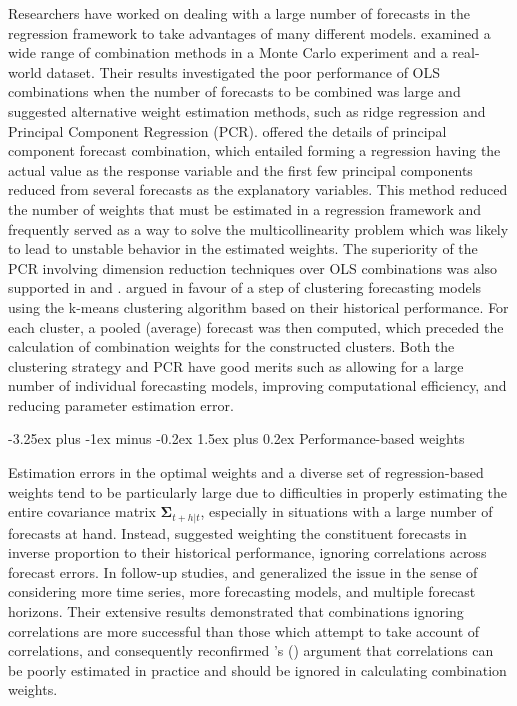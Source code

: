 \documentclass[11pt]{article}
\makeatletter
\def\citeapos#1{\citeauthor{#1}'s (\citeyear{#1})}
\renewcommand{\paragraph}{\@startsection{paragraph}{4}{0ex}%
   {-3.25ex plus -1ex minus -0.2ex}%
   {1.5ex plus 0.2ex}%
   {\normalfont\normalsize\bfseries}}
\makeatother
\begin{document}
Researchers have worked on dealing with a large number of forecasts in the regression framework to take advantages of many different models. \cite{Chan1999-io} examined a wide range of combination methods in a Monte Carlo experiment and a real-world dataset. Their results investigated the poor performance of OLS combinations when the number of forecasts to be combined was large and suggested alternative weight estimation methods, such as ridge regression and Principal Component Regression (PCR). \cite{Stock2004-rq} offered the details of principal component forecast combination, which entailed forming a regression having the actual value as the response variable and the first few principal components reduced from several forecasts as the explanatory variables. This method reduced the number of weights that must be estimated in a regression framework and frequently served as a way to solve the multicollinearity problem which was likely to lead to unstable behavior in the estimated weights. The superiority of the PCR involving dimension reduction techniques over OLS combinations was also supported in \cite{Rapach2008-jh} and \cite{Poncela2011-vz}. \cite{Aiolfi2006-rh} argued in favour of a step of clustering forecasting models using the k-means clustering algorithm based on their historical performance. For each cluster, a pooled (average) forecast was then computed, which preceded the calculation of combination weights for the constructed clusters. Both the clustering strategy and PCR have good merits such as allowing for a large number of individual forecasting models, improving computational efficiency, and reducing parameter estimation error.

\paragraph{Performance-based weights}

Estimation errors in the optimal weights and a diverse set of regression-based weights tend to be particularly large due to difficulties in properly estimating the entire covariance matrix $\boldsymbol{\Sigma}_{t+h|t}$, especially in situations with a large number of forecasts at hand. Instead, \cite{Bates1969-yj} suggested weighting the constituent forecasts in inverse proportion to their historical performance, ignoring correlations across forecast errors. In follow-up studies, \cite{Newbold1974-lp} and \cite{Winkler1983-ra} generalized the issue in the sense of considering more time series, more forecasting models, and multiple forecast horizons. Their extensive results demonstrated that combinations ignoring correlations are more successful than those which attempt to take account of correlations, and consequently reconfirmed \citeapos{Bates1969-yj} argument that correlations can be poorly estimated in practice and should be ignored in calculating combination weights.
\end{document}
